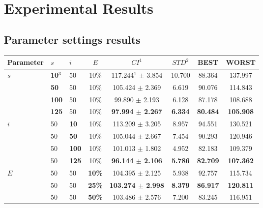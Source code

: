 \chapter{Experimental Results}
\label{appendixC}

\section{Parameter settings results}

\begin{table}
    \centering
    \begin{tabular}{|l|l|l|c||c|c|c|c|}
    \hline
    Parameter & $s$ & $i$ & $E$ & $CI^1$ & $STD^2$ & BEST & WORST \\
    \hline
    $s$ & \textbf{10$^3$} & 50 & 10\% & 117.244$^1$ $\pm$ 3.854 & 10.700 & 88.364 & 137.997\\
    ~ & \textbf{50} & 50 & 10\% & 105.424 $\pm$ 2.369 & 6.619 & 90.076 & 114.843\\
    ~ & \textbf{100} & 50 & 10\% & 99.890 $\pm$ 2.193 & 6.128 & 87.178 & 108.688\\
    ~ & \textbf{125} & 50 & 10\% & \textbf{97.994 $\pm$ 2.267} & \textbf{6.334} & \textbf{80.484} & \textbf{105.908}\\
    \hline
    $i$ & 50 & \textbf{10} & 10\% & 113.209 $\pm$ 3.205 & 8.957 & 94.551 & 130.521\\
    ~ & 50 & \textbf{50} & 10\% & 105.044 $\pm$ 2.667 & 7.454 & 90.293 & 120.946\\
    ~ & 50 & \textbf{100} & 10\% & 101.013 $\pm$ 1.802 & 4.952 & 82.183 & 109.379\\
    ~ & 50 & \textbf{125} & 10\% & \textbf{96.144 $\pm$ 2.106} & \textbf{5.786} & \textbf{82.709} & \textbf{107.362}\\
    \hline
    $E$ & 50 & 50 & \textbf{10\%} & 104.395 $\pm$ 2.125 & 5.938 & 92.757 & 115.734\\
    ~ & 50 & 50 & \textbf{25\%} & \textbf{103.274 $\pm$ 2.998} & \textbf{8.379} & \textbf{86.917} & \textbf{120.811}\\
    ~ & 50 & 50 & \textbf{50\%} & 103.486 $\pm$ 2.576 & 7.200 & 83.245 & 116.951\\

\end{tabular}
\end{table}
